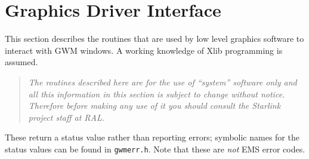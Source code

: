 \documentclass[twoside,11pt]{article}
\newcommand{\htmladdnormallink}[2]{#1}
\renewcommand{\_}{\texttt{\symbol{95}}}
\begin{document}
\section{Graphics Driver Interface}

This section describes the routines that are used by low level graphics
software to interact with GWM windows. A working knowledge of Xlib
programming is assumed.
\begin{quote}{\em
The routines described here are for the use of ``system'' software only
and all this information in this section is subject to change without
notice. Therefore before making any use of it you should consult the
\htmladdnormallink{Starlink project staff}{http://www.starlink.ac.uk/people.html}
at RAL.}
\end{quote}
These return a status value rather than reporting errors; symbolic names
for the status values can be found in {\tt gwm\_err.h}. Note that these are
{\em not} EMS error codes.
\end{document}
